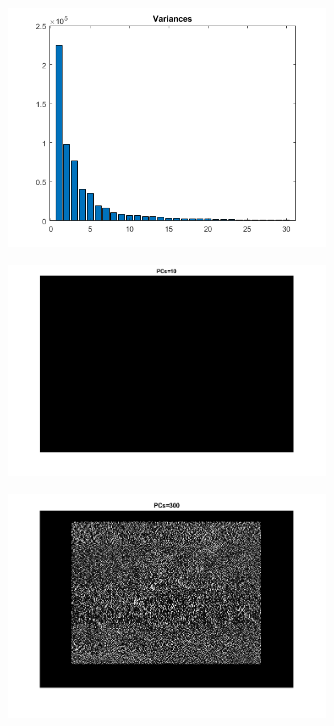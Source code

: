 \documentclass[11pt]{article}
\begin{document}
\begin{figure}[!h]
  \centering
  \includegraphics[width=0.75\textwidth]{../q6/variances.png}
  \label{fig:var}
\end{figure}


\begin{figure}[!h]
  \centering
  \includegraphics[width=0.75\textwidth]{../q6/compressed_10.png}
  \label{fig:comp10}
\end{figure}

\begin{figure}[!h]
  \centering
  \includegraphics[width=0.75\textwidth]{../q6/compressed_300.png}
  \label{fig:comp300}
\end{figure}
\end{document}
